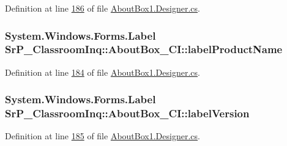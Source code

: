 \-Definition at line \hyperlink{_about_box1_8_designer_8cs_source_l00186}{186} of file \hyperlink{_about_box1_8_designer_8cs_source}{\-About\-Box1.\-Designer.\-cs}.

\hypertarget{class_sr_p___classroom_inq_1_1_about_box___c_i_a63c3b787bac631c7424ff015b247289c}{
\subsubsection[{label\-Product\-Name}]{\setlength{\rightskip}{0pt plus 5cm}\-System.\-Windows.\-Forms.\-Label {\bf \-Sr\-P\-\_\-\-Classroom\-Inq\-::\-About\-Box\-\_\-\-C\-I\-::label\-Product\-Name}}}
\label{class_sr_p___classroom_inq_1_1_about_box___c_i_a63c3b787bac631c7424ff015b247289c}


\-Definition at line \hyperlink{_about_box1_8_designer_8cs_source_l00184}{184} of file \hyperlink{_about_box1_8_designer_8cs_source}{\-About\-Box1.\-Designer.\-cs}.

\hypertarget{class_sr_p___classroom_inq_1_1_about_box___c_i_a2993cc4848bd6149f8162bf55a7fa310}{
\subsubsection[{label\-Version}]{\setlength{\rightskip}{0pt plus 5cm}\-System.\-Windows.\-Forms.\-Label {\bf \-Sr\-P\-\_\-\-Classroom\-Inq\-::\-About\-Box\-\_\-\-C\-I\-::label\-Version}}}
\label{class_sr_p___classroom_inq_1_1_about_box___c_i_a2993cc4848bd6149f8162bf55a7fa310}


\-Definition at line \hyperlink{_about_box1_8_designer_8cs_source_l00185}{185} of file \hyperlink{_about_box1_8_designer_8cs_source}{\-About\-Box1.\-Designer.\-cs}.

